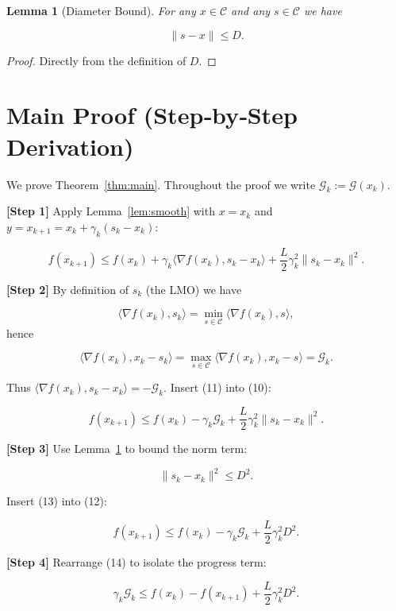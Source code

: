 \documentclass{article}
\newtheorem{lemma}{Lemma}
\newcommand{\gap}{\mathcal{G}}
\newcommand{\diam}{D}
\begin{document}
\begin{lemma}[Diameter Bound]\label{lem:diam}
For any $x\in\mathcal C$ and any $s\in\mathcal C$ we have  

\[
\|s-x\|\le\diam .
\tag{9}
\]
\end{lemma}
\begin{proof}
Directly from the definition of $\diam$.
\end{proof}

\section*{Main Proof (Step‑by‑Step Derivation)}
We prove Theorem~\ref{thm:main}.  Throughout the proof we write $\gap_{k}:=\gap(x_{k})$.

\medskip
\noindent\textbf{[Step 1]} Apply Lemma~\ref{lem:smooth} with $x=x_{k}$ and $y=x_{k+1}=x_{k}+\gamma_{k}(s_{k}-x_{k})$:

\[
f(x_{k+1})\le f(x_{k})+\gamma_{k}\langle\nabla f(x_{k}),s_{k}-x_{k}\rangle
            +\frac{L}{2}\gamma_{k}^{2}\|s_{k}-x_{k}\|^{2}.
\tag{10}
\]

\noindent\textbf{[Step 2]} By definition of $s_{k}$ (the LMO) we have  

\[
\langle\nabla f(x_{k}),s_{k}\rangle
   =\min_{s\in\mathcal C}\langle\nabla f(x_{k}),s\rangle,
\]
hence  

\[
\langle\nabla f(x_{k}),x_{k}-s_{k}\rangle
   =\max_{s\in\mathcal C}\langle\nabla f(x_{k}),x_{k}-s\rangle
   =\gap_{k}.
\tag{11}
\]

Thus $\langle\nabla f(x_{k}),s_{k}-x_{k}\rangle=-\gap_{k}$.
Insert (11) into (10):

\[
f(x_{k+1})\le f(x_{k})-\gamma_{k}\gap_{k}
            +\frac{L}{2}\gamma_{k}^{2}\|s_{k}-x_{k}\|^{2}.
\tag{12}
\]

\noindent\textbf{[Step 3]} Use Lemma~\ref{lem:diam} to bound the norm term:

\[
\|s_{k}-x_{k}\|^{2}\le\diam^{2}.
\tag{13}
\]

Insert (13) into (12):

\[
f(x_{k+1})\le f(x_{k})-\gamma_{k}\gap_{k}
            +\frac{L}{2}\gamma_{k}^{2}\diam^{2}.
\tag{14}
\]

\noindent\textbf{[Step 4]} Rearrange (14) to isolate the progress term:

\[
\gamma_{k}\gap_{k}\le f(x_{k})-f(x_{k+1})
                   +\frac{L}{2}\gamma_{k}^{2}\diam^{2}.
\tag{15}
\]
\end{document}
